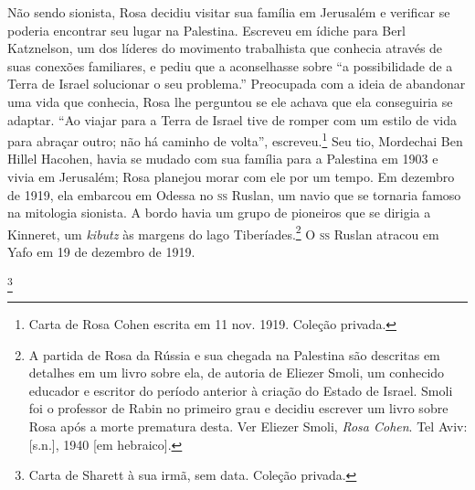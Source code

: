 Não sendo sionista, Rosa decidiu visitar sua família em Jerusalém e
verificar se poderia encontrar seu lugar na Palestina. Escreveu em
ídiche para Berl Katznelson, um dos líderes do movimento trabalhista
que conhecia através de suas conexões familiares, e pediu que a
aconselhasse sobre ``a possibilidade de a Terra de Israel solucionar o
seu problema.'' Preocupada com a ideia de abandonar uma vida que
conhecia, Rosa lhe perguntou se ele achava que ela conseguiria se
adaptar. ``Ao viajar para a Terra de Israel tive de romper com um estilo
de vida para abraçar outro; não há caminho de volta'', escreveu.\footnote{Carta de Rosa Cohen
escrita em 11 nov. 1919. Coleção privada.} Seu tio, Mordechai Ben
Hillel Hacohen, havia se mudado com sua família para a Palestina em 1903
e vivia em Jerusalém; Rosa planejou morar com ele por um tempo. Em
dezembro de 1919, ela embarcou em Odessa no \textsc{ss} Ruslan, um navio
que se tornaria famoso na mitologia sionista. A bordo havia um grupo de
pioneiros que se dirigia a Kinneret, um \textit{kibutz} às margens do lago
Tiberíades.\footnote{A partida de Rosa da Rússia e sua chegada na Palestina são
descritas em detalhes em um livro sobre ela, de autoria de Eliezer Smoli,
um conhecido educador e escritor do período anterior à criação do Estado
de Israel. Smoli foi o professor de Rabin no primeiro grau e decidiu
escrever um livro sobre Rosa após a morte prematura desta. Ver Eliezer
Smoli, \textit{Rosa Cohen}. Tel Aviv: {[}s.n.{]}, 1940 {[}em hebraico{]}.} 
O \textsc{ss} Ruslan atracou em Yafo em 19 de dezembro de 1919.

\footnote{Carta de Sharett à sua irmã, sem data. Coleção privada.}

